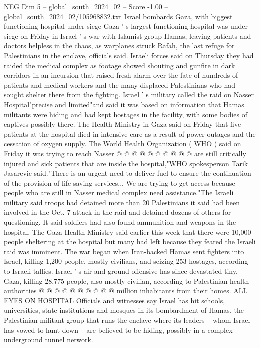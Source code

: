 \begin{textsample}{NEG Dim 5 – global\_south\_2024\_02 – Score -1.00 – global\_south\_2024\_02/105968832.txt}  \label{ex:f5_neg_254}
Israel bombards Gaza, with biggest functioning hospital under siege Gaza ' s largest functioning hospital was under siege on Friday in Israel ' s war with Islamist group Hamas, leaving patients and doctors helpless in the chaos, as warplanes struck Rafah, the last refuge for Palestinians in the enclave, officials said.
Israeli forces said on Thursday they had raided the medical complex as footage showed shouting and gunfire in dark corridors in an incursion that raised fresh alarm over the fate of hundreds of patients and medical workers and the many displaced Palestinians who had sought shelter there from the fighting.
Israel ' s military called the raid on Nasser Hospital"precise and limited"and said it was based on information that Hamas militants were hiding and had kept hostages in the facility, with some bodies of captives possibly there.
The Health Ministry in Gaza said on Friday that five patients at the hospital died in intensive care as a result of power outages and the cessation of oxygen supply.
The World Health Organization ( WHO ) said on Friday it was trying to reach Nasser @ @ @ @ @ @ @ @ @ @ are still critically injured and sick patients that are inside the hospital,"WHO spokesperson Tarik Jasarevic said."There is an urgent need to deliver fuel to ensure the continuation of the provision of life-saving services...
We are trying to get access because people who are still in Nasser medical complex need assistance."The Israeli military said troops had detained more than 20 Palestinians it said had been involved in the Oct. 7 attack in the raid and detained dozens of others for questioning.
It said soldiers had also found ammunition and weapons in the hospital.
The Gaza Health Ministry said earlier this week that there were 10,000 people sheltering at the hospital but many had left because they feared the Israeli raid was imminent.
The war began when Iran-backed Hamas sent fighters into Israel, killing 1,200 people, mostly civilians, and seizing 253 hostages, according to Israeli tallies.
Israel ' s air and ground offensive has since devastated tiny, Gaza, killing 28,775 people, also mostly civilian, according to Palestinian health authorities @ @ @ @ @ @ @ @ @ @ million inhabitants from their homes.
ALL EYES ON HOSPITAL Officials and witnesses say Israel has hit schools, universities, state institutions and mosques in its bombardment of Hamas, the Palestinian militant group that runs the enclave where its leaders -- whom Israel has vowed to hunt down -- are believed to be hiding, possibly in a complex underground tunnel network.

\end{textsample}
